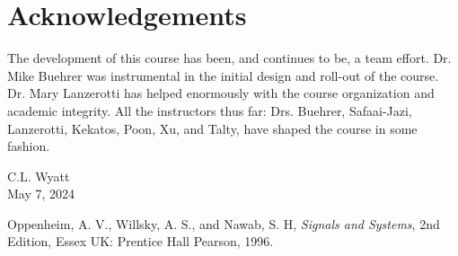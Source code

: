 \documentclass[]{book}
\theoremstyle{definition}
\numberwithin{section}{chapter}
\numberwithin{equation}{chapter}
\begin{document}
\section*{Acknowledgements}
The development of this course has been, and continues to be, a team effort. Dr. Mike Buehrer was instrumental in the initial design and roll-out of the course. Dr. Mary Lanzerotti has helped enormously with the course organization and academic integrity. All the instructors thus far: Drs. Buehrer, Safaai-Jazi, Lanzerotti, Kekatos, Poon, Xu, and Talty, have shaped the course in some fashion.

\vspace{2em}
\begin{flushright}
C.L. Wyatt\\
May 7, 2024
\end{flushright}


\tableofcontents
\mainmatter
























\appendix



\backmatter

\begin{thebibliography}{9}

  Oppenheim, A. V., Willsky, A. S., and Nawab, S. H, \textit{Signals and Systems}, 2nd Edition, Essex UK: Prentice Hall Pearson, 1996.

\end{thebibliography}

\printindex
\end{document}
